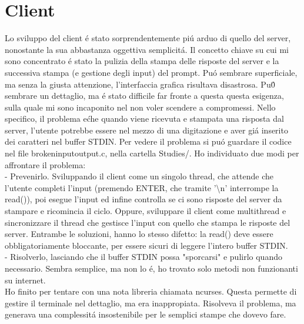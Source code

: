 \section{Client}

Lo sviluppo del client \'e stato sorprendentemente pi\'u arduo di quello del server, nonostante la sua abbastanza oggettiva semplicit\'a. Il concetto chiave su cui mi sono concentrato \'e stato la pulizia della stampa delle risposte del server e la successiva stampa (e gestione degli input) del prompt. Pu\'o sembrare superficiale, ma senza la giusta attenzione, l'interfaccia grafica risultava disastrosa. Pu\'0 sembrare un dettaglio, ma \'e stato difficile far fronte a questa questa esigenza,  sulla quale mi sono incaponito nel non voler scendere a compromessi. Nello specifico, il problema e\' che quando viene ricevuta e stampata una risposta dal server, l'utente potrebbe essere nel mezzo di una digitazione e aver gi\'a inserito dei caratteri nel buffer STDIN. Per vedere il problema si pu\'o guardare il codice nel file brokeninputoutput.c, nella cartella Studies/. Ho individuato due modi per affrontare il problema:
\\
- Prevenirlo. Sviluppando il client come un singolo thread, che attende che l'utente completi l'input (premendo ENTER, che tramite '\textbackslash n' interrompe la read()), poi esegue l'input ed infine controlla se ci sono risposte del server da stampare e ricomincia il ciclo. Oppure, sviluppare il client come multithread e sincronizzare il thread che gestisce l'input con quello che stampa le risposte del server. Entrambe le soluzioni, hanno lo stesso difetto: la read() deve essere obbligatoriamente bloccante, per essere sicuri di leggere l'intero buffer STDIN.
\\
- Risolverlo, lasciando che il buffer STDIN possa "sporcarsi" e pulirlo quando necessario. Sembra semplice, ma non lo \'e, ho trovato solo metodi non funzionanti su internet.
\\
Ho finito per tentare con una nota libreria chiamata ncurses. Questa permette di gestire il terminale nel dettaglio, ma era inappropiata. Risolveva il problema, ma generava una complessit\'a insostenibile per le semplici stampe che dovevo fare. 
\\
